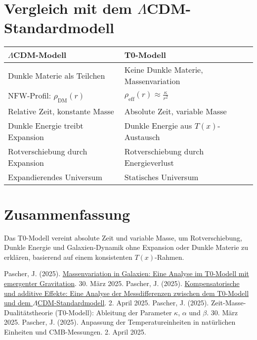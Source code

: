 \documentclass[a4paper,12pt]{article}
\theoremstyle{definition}
\theoremstyle{remark}
\newcommand{\Tfield}{T(x)}
\begin{document}
	\section{Vergleich mit dem \(\Lambda\)CDM-Standardmodell}
	
	\begin{tcolorbox}[colback=yellow!5!white,colframe=yellow!75!black,title=Vergleich der Modelle]
		\begin{tabular}{p{}|p{}}
			\toprule
			\textbf{\(\Lambda\)CDM-Modell} & \textbf{T0-Modell} \\
			\midrule
			Dunkle Materie als Teilchen & Keine Dunkle Materie, Massenvariation \\
			NFW-Profil: \(\rho_{\text{DM}}(r)\) & \(\rho_{\text{eff}}(r) \approx \frac{\kappa}{r^2}\) \\
			Relative Zeit, konstante Masse & Absolute Zeit, variable Masse \\
			Dunkle Energie treibt Expansion & Dunkle Energie aus \(\Tfield\)-Austausch \\
			Rotverschiebung durch Expansion & Rotverschiebung durch Energieverlust \\
			Expandierendes Universum & Statisches Universum \\
			\bottomrule
		\end{tabular}
	\end{tcolorbox}
	
	\section{Zusammenfassung}
	
	Das T0-Modell vereint absolute Zeit und variable Masse, um Rotverschiebung, Dunkle Energie und Galaxien-Dynamik ohne Expansion oder Dunkle Materie zu erklären, basierend auf einem konsistenten \(\Tfield\)-Rahmen.
	
	\begin{thebibliography}{9}
		 Pascher, J. (2025). \href{https://github.com/jpascher/T0-Time-Mass-Duality/tree/main/2/pdf/Deutsch/Massenvariation in Galaxien - Eine Analyse im T0-Modell mit emergenter Gravitation.pdf}{Massenvariation in Galaxien: Eine Analyse im T0-Modell mit emergenter Gravitation}. 30. März 2025.
		 Pascher, J. (2025). \href{https://github.com/jpascher/T0-Time-Mass-Duality/tree/main/2/pdf/Deutsch/Analyse der Messdifferenzen zwischen dem T0-Modell und dem Standardmodell.pdf}{Kompensatorische und additive Effekte: Eine Analyse der Messdifferenzen zwischen dem T0-Modell und dem \(\Lambda\)CDM-Standardmodell}. 2. April 2025.
		 Pascher, J. (2025). Zeit-Masse-Dualitätstheorie (T0-Modell): Ableitung der Parameter \(\kappa\), \(\alpha\) und \(\beta\). 30. März 2025.
		 Pascher, J. (2025). Anpassung der Temperatureinheiten in natürlichen Einheiten und CMB-Messungen. 2. April 2025.
	\end{thebibliography}
	
\end{document}
